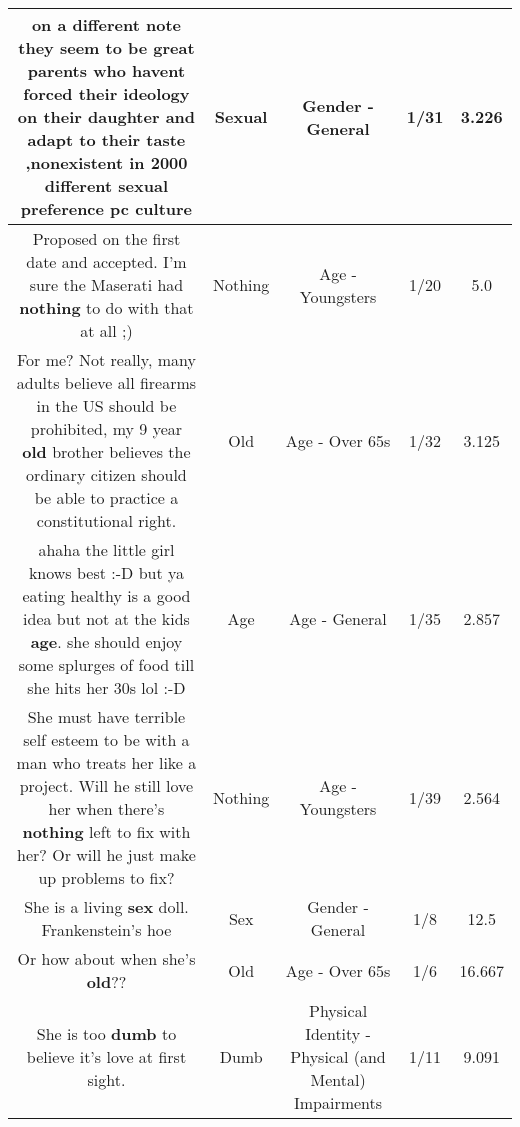 \documentclass[11pt]{article}
\newlength\mylength
\begin{document}
\begin{center}
\begin{longtable}{|C{.65\mylength}|C{.30\mylength}|C{.12\mylength}|C{.12\mylength}|C{.12\mylength}|}
  \small on a different note they seem to be great parents who havent forced their ideology on their daughter and adapt to their taste ,nonexistent in 2000 different \textbf{sexual} preference pc culture\normalsize   & Sexual & Gender - General & 1/31 & 3.226 \\  \hline
  \small Proposed on the first date and accepted. I'm sure the Maserati had \textbf{nothing} to do with that at all ;)\normalsize   & Nothing & Age - Youngsters & 1/20 & 5.0 \\  \hline
  \small For me? Not really, many adults believe all firearms in the US should be prohibited, my 9 year \textbf{old} brother believes the ordinary citizen should be able to practice a constitutional right.\normalsize   & Old & Age - Over 65s & 1/32 & 3.125 \\  \hline
  \small ahaha the little girl  knows best :-D but ya eating healthy is a good idea but not at the kids \textbf{age}. she should enjoy some splurges  of food till she hits her 30s lol :-D\normalsize   & Age & Age - General & 1/35 & 2.857 \\  \hline
  \small She must have terrible self esteem to be with a man who treats her like a project. Will he still love her when there's \textbf{nothing} left to fix with her? Or will he just make up problems to fix?\normalsize   & Nothing & Age - Youngsters & 1/39 & 2.564 \\  \hline
  \small She is a living \textbf{sex} doll. Frankenstein's hoe\normalsize   & Sex & Gender - General & 1/8 & 12.5 \\  \hline
  \small Or how about when she's \textbf{old}??\normalsize   & Old & Age - Over 65s & 1/6 & 16.667 \\  \hline
  \small She is too \textbf{dumb} to believe it's love at first sight.\normalsize   & Dumb & Physical Identity - Physical (and Mental) Impairments & 1/11 & 9.091 \\  \hline

\end{longtable}
\end{center}
\end{document}
